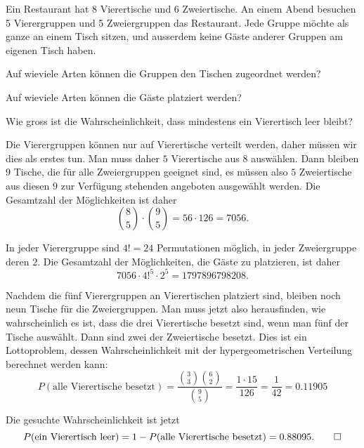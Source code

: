 Ein Restaurant hat 8 Vierertische und 6 Zweiertische.
An einem Abend besuchen 5 Vierergruppen und 5 Zweiergruppen das Restaurant.
Jede Gruppe möchte als ganze an einem Tisch sitzen, und ausserdem
keine Gäste anderer Gruppen am eigenen Tisch haben.
\begin{teilaufgaben}
\item Auf wieviele Arten können die Gruppen den Tischen zugeordnet
werden?
\item Auf wieviele Arten können die Gäste platziert werden?
\item Wie gross ist die Wahrscheinlichkeit, dass mindestens ein Vierertisch
leer bleibt?
\end{teilaufgaben}


\begin{loesung}
\begin{teilaufgaben}
\item
Die Vierergruppen können nur auf Vierertische verteilt werden,
daher müssen wir dies als erstes tun.
Man muss daher $5$ Vierertische aus $8$ auswählen.
Dann bleiben $9$ Tische, die für alle Zweiergruppen geeignet sind,
es müssen also $5$ Zweiertische aus diesen $9$ zur Verfügung stehenden
angeboten ausgewählt werden. 
Die Gesamtzahl der Möglichkeiten ist daher
\[
\binom{8}{5}\cdot\binom{9}{5}=
56\cdot 126=7056.
\]
\item
In jeder Vierergruppe sind $4!=24$ Permutationen möglich, in jeder
Zweiergruppe deren $2$.
Die Gesamtzahl der Möglichkeiten, die Gäste zu platzieren, ist daher
\[
7056\cdot 4!^5 \cdot 2^5=1797896798208.
\]
\item
Nachdem die fünf Vierergruppen an Vierertischen platziert sind, bleiben
noch neun Tische für die Zweiergruppen.
Man muss jetzt also herausfinden, wie wahrscheinlich es ist, dass die
drei Vierertische besetzt sind, wenn man fünf der Tische auswählt.
Dann sind zwei der Zweiertische besetzt.
Dies ist ein Lottoproblem, dessen Wahrscheinlichkeit mit der
hypergeometrischen Verteilung berechnet werden kann:
\[
P(\text{alle Vierertische besetzt})
=
\frac{\binom{3}{3}\binom{6}{2}}{\binom{9}{5}}
=
\frac{1\cdot 15}{126}
=
\frac1{42}=0.11905
\]
\end{teilaufgaben}
Die gesuchte Wahrscheinlichkeit ist jetzt
\[
P(\text{ein Vierertisch leer})
=
1-P(\text{alle Vierertische besetzt})
=
0.88095.
\qedhere
\]
\end{loesung}


